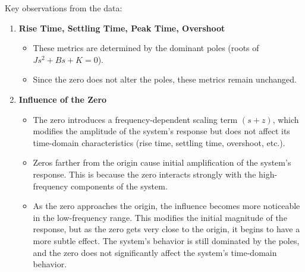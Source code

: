 \documentclass[a4paper, 12pt, english]{article}
\begin{document}
Key observations from the data:
\begin{enumerate}
    \item \textbf{Rise Time, Settling Time, Peak Time, Overshoot}
    \begin{itemize}
        \item These metrics are determined by the dominant poles (roots of $ {J}{{s}^{2}} + {B}{s} + {K} = 0 $).
        \item Since the zero does not alter the poles, these metrics remain unchanged.
    \end{itemize}
    \item \textbf{Influence of the Zero}
    \begin{itemize}
        \item The zero introduces a frequency-dependent scaling term $ \left( {s} + {z} \right) $, which modifies the amplitude of the system's response but does not affect its time-domain characteristics (rise time, settling time, overshoot, etc.).
        \item Zeros farther from the origin cause initial amplification of the system's response. This is because the zero interacts strongly with the high-frequency components of the system.
        \item As the zero approaches the origin, the influence becomes more noticeable in the low-frequency range. This modifies the initial magnitude of the response, but as the zero gets very close to the origin, it begins to have a more subtle effect. The system's behavior is still dominated by the poles, and the zero does not significantly affect the system's time-domain behavior.
    \end{itemize}
\end{enumerate}

\end{document}

